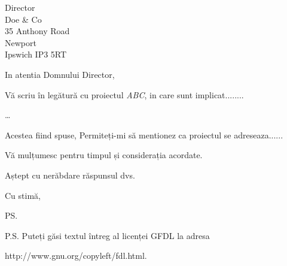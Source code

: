 \documentclass[a4paper,12pt]{letter}
\begin{document}
\begin{letter}{Director \\ Doe \& Co \\ 35 Anthony Road
\\ Newport \\ Ipswich IP3 5RT}
\opening{In atentia Domnului Director,}

Vă scriu în legătură cu proiectul \textit{ABC}, in care sunt implicat........

\ldots 

Acestea fiind spuse, Permiteți-mi să mentionez ca proiectul se adreseaza......

Vă mulțumesc pentru timpul și considerația acordate.

Aștept cu nerăbdare răspunsul dvs.

\closing{Cu stimă,}
\ps{P.S. Puteți găsi textul întreg al licenței GFDL la adresa

http://www.gnu.org/copyleft/fdl.html.}

\end{letter}
\end{document}
